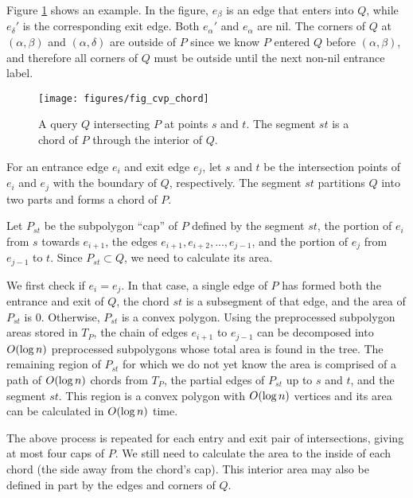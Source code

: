 Figure \ref{fig:convexp:chord} shows an example. In the figure, $e_\beta$ is an edge that enters into $Q$, while $e_\delta'$ is the corresponding exit edge. Both $e_\alpha'$ and $e_\alpha$ are nil. The corners of $Q$ at $(\alpha, \beta)$ and $(\alpha, \delta)$ are outside of $P$ since we know $P$ entered $Q$ before $(\alpha, \beta)$, and therefore all corners of $Q$ must be outside until the next non-nil entrance label.

\begin{figure}[t]
\begin{center}
  \texttt{[image: figures/fig\_cvp\_chord]}
  \caption[A query $Q$ intersecting $P$ at points $s$ and $t$.]{A query $Q$ intersecting $P$ at points $s$ and $t$. The segment $st$ is a chord of $P$ through the interior of $Q$.}
  \label{fig:convexp:chord}
\end{center}
\end{figure}

For an entrance edge $e_i$ and exit edge $e_j$, let $s$ and $t$ be the intersection points of $e_i$ and $e_j$ with the boundary of $Q$, respectively. 
The segment $st$ partitions $Q$ into two parts and forms a chord of $P$.

Let $P_{st}$ be the subpolygon ``cap'' of $P$ defined by the segment $st$, the portion of $e_i$ from $s$ towards $e_{i+1}$, the edges $e_{i+1}, e_{i+2}, ..., e_{j-1}$, and the portion of $e_j$ from $e_{j-1}$ to $t$.
Since $P_{st} \subset Q$, we need to calculate its area.

We first check if $e_i = e_j$.
In that case, a single edge of $P$ has formed both the entrance and exit of $Q$, the chord $st$ is a subsegment of that edge, and the area of $P_{st}$ is 0.
Otherwise, $P_{st}$ is a convex polygon.
Using the preprocessed subpolygon areas stored in $T_P$, the chain of edges $e_{i+1}$ to $e_{j-1}$ can be decomposed into $O\!\left(\log{n}\right)$ preprocessed subpolygons whose total area is found in the tree.
The remaining region of $P_{st}$ for which we do not yet know the area is comprised of a path of $O\!\left(\log{n}\right)$ chords from $T_P$, the partial edges of $P_{st}$ up to $s$ and $t$, and the segment $st$.
This region is a convex polygon with $O\!\left(\log{n}\right)$ vertices and its area can be calculated in $O\!\left(\log{n}\right)$ time.

The above process is repeated for each entry and exit pair of intersections, giving at most four caps of $P$.
We still need to calculate the area to the inside of each chord (the side away from the chord's cap).
This interior area may also be defined in part by the edges and corners of $Q$. 

